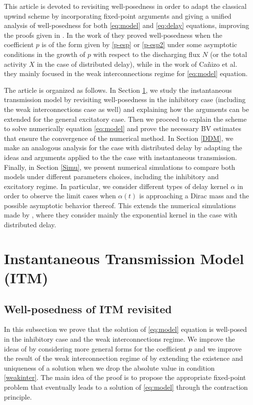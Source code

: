 \documentclass[11pt,a4paper]{article}
\begin{document}
This article is devoted to revisiting well-posedness in order to adapt the classical upwind scheme by incorporating fixed-point arguments and giving a unified analysis of well-posedness for both \eqref{eq:model} and \eqref{eq:delay} equations, improving the proofs given in \cite{pakdaman2009dynamics,canizo2019asymptotic}. In the work of 
\cite{pakdaman2009dynamics} they proved well-posedness when the coefficient $p$ is of the form given by \eqref{p-esp} or \eqref{p-esp2} under some asymptotic conditions in the growth of $p$ with respect to the discharging flux $N$ (or the total activity $X$ in the case of distributed delay), while in the work of Cañizo et al. \cite{canizo2019asymptotic} they mainly focused in the weak interconnections regime for \eqref{eq:model} equation.


The article is organized as follows. In Section \ref{ITM}, we study the instantaneous transmission model by revisiting well-posedness in the inhibitory case (including the weak interconnections case as well) and explaining how the arguments can be extended for the general excitatory case. Then we proceed to explain the scheme to solve numerically equation \ref{eq:model} and prove the necessary BV estimates that ensure the convergence of the numerical method. In Section \ref{DDM}, we make an analogous analysis for the case with distributed delay by adapting the ideas and arguments applied to the the case with instantaneous transmission. Finally, in Section \ref{Simu}, we present numerical simulations to compare both models under different parameters choices, including the inhibitory and excitatory regime. In particular, we consider different types of delay kernel $\alpha$ in order to observe the limit cases when $\alpha(t)$ is approaching a Dirac mass and the possible asymptotic behavior thereof. This extends the numerical simulations made by 
\cite{pakdaman2009dynamics}, where they consider mainly the exponential kernel in the case with distributed delay.


\section{Instantaneous Transmission Model (ITM)}
\label{ITM}

\subsection{Well-posedness of ITM revisited}
In this subsection we prove that the solution of \eqref{eq:model} equation is well-posed in the inhibitory case and the weak interconnections regime. We improve the ideas of 
\cite{pakdaman2009dynamics} by considering more general forms for the coefficient $p$ and we improve the result of the weak interconnection regime of \cite{canizo2019asymptotic} by extending the existence and uniqueness of a solution when we drop the absolute value in condition \eqref{weakinter}. The main idea of the proof is to propose the appropriate fixed-point problem that eventually leads to a solution of \eqref{eq:model} through the contraction principle.
\end{document}
